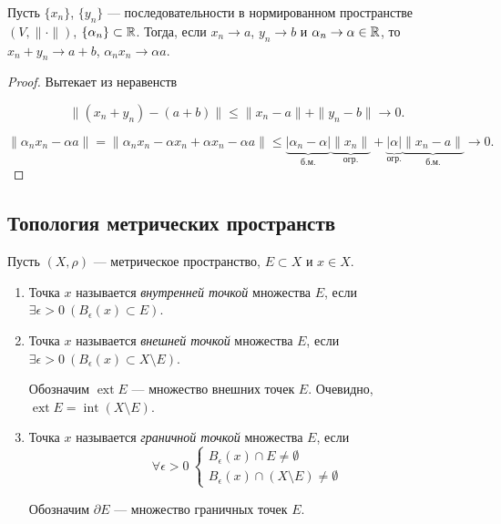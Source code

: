 \begin{property}
    Пусть $\{x_n\}$, $\{y_n\}$ --- последовательности в нормированном пространстве $(V, \|\cdot\|)$, $\{\alpha_n\} \subset \mathbb{R}$. Тогда, если $x_n \rightarrow a$, $y_n \rightarrow b$ и $\alpha_n \rightarrow \alpha \in \mathbb{R}$, то $x_n + y_n \rightarrow a + b$, $\alpha_n x_n \rightarrow \alpha a$.

    \begin{proof}
        Вытекает из неравенств
        
        \[\|(x_n + y_n) - (a + b)\| \le \|x_n - a\| + \|y_n - b\| \rightarrow 0.\]

        \[\|\alpha_n x_n - \alpha a\| = \|\alpha_{n}x_{n} - \alpha x_{n} + \alpha x_{n} - \alpha a\| \le \underbrace{|\alpha_{n} - \alpha|}_{\text{б.м.}}\underbrace{\|x_{n}\|}_{\text{огр.}} + \underbrace{|\alpha|}_{\text{огр.}}\underbrace{\|x_{n} - a\|}_{\text{б.м.}} \to 0.\]
    \end{proof}
\end{property}

\subsection{Топология метрических пространств}

\begin{definition}
    Пусть $(X, \rho)$ --- метрическое пространство, $E \subset X$ и $x \in X$.

    \begin{enumerate}
        \item Точка $x$ называется \emph{внутренней точкой} множества $E$, если $\exists \epsilon > 0 \ (B_\epsilon(x) \subset E)$.
        \item Точка $x$ называется \emph{внешней точкой} множества $E$, если $\exists \epsilon > 0 \ (B_\epsilon(x) \subset X \setminus E)$.

            Обозначим $\operatorname{ext} E$ --- множество внешних точек $E$. Очевидно, $\operatorname{ext} E = \operatorname{int} (X \setminus E)$.

        \item Точка $x$ называется \emph{граничной точкой} множества $E$, если
            \[
                \forall \epsilon > 0 \ \left\{\begin{array}{l}B_\epsilon (x) \cap E \neq \emptyset \\ B_\epsilon (x) \cap (X \setminus E) \neq \emptyset\end{array}\right.
            \]

            Обозначим $\partial E$ --- множество граничных точек $E$.
    \end{enumerate}
\end{definition}

